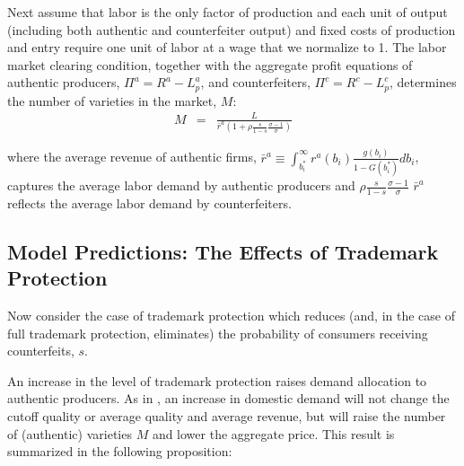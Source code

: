 \documentclass[12pt]{article}
\begin{document}
Next assume that labor is the only factor of production and each unit of output (including both authentic and counterfeiter output) and fixed costs of production and entry require one unit of labor at a wage that we normalize to 1. %
The labor market clearing condition, together with the aggregate profit equations of authentic producers, $\Pi^a = R^a - L_p^a$, and counterfeiters, $\Pi^c = R^c - L_p^c$, determines the number of varieties in the market, $M$:
\begin{eqnarray} \label{eq:M_solution}
M  & = &  \frac{L}{\bar{r}^a \left( 1+\rho \frac{s}{1-s}  \frac{\sigma - 1}{\sigma}   \right)}
\end{eqnarray}

\noindent where  the average revenue of authentic firms, $\bar{r}^a \equiv \int_{b_i^{\ast}}^{\infty} r^{a}(b_i)  \frac{g(b_i)}{1 - G(b_i^{\ast})}  d b_i$, captures the average labor demand by authentic producers and $\rho \frac{s}{1-s}  \frac{\sigma - 1}{\sigma}$ $\bar{r}^a$ reflects the average labor demand by counterfeiters.


\subsection{Model Predictions: The Effects of Trademark Protection}

Now consider the case of trademark protection which reduces (and, in the case of full trademark protection, eliminates) the probability of consumers receiving counterfeits, $s$. 

An increase in the level of trademark protection raises demand allocation to authentic producers. As in \cite{Melitz2003}, an increase in domestic demand will not change the cutoff quality or average quality and average revenue, but will raise the number of (authentic) varieties $M$ and lower the aggregate price. This result is summarized in the following proposition:\vspace{0.3cm}
\end{document}
